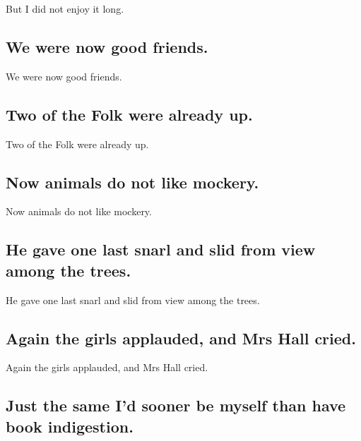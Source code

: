 \documentclass[]{article}
\begin{document}
But I did not enjoy it long.

\hypertarget{we-were-now-good-friends.}{%
\subsection{We were now good friends.}\label{we-were-now-good-friends.}}

We were now good friends.

\hypertarget{two-of-the-folk-were-already-up.}{%
\subsection{Two of the Folk were already
up.}\label{two-of-the-folk-were-already-up.}}

Two of the Folk were already up.

\hypertarget{now-animals-do-not-like-mockery.}{%
\subsection{Now animals do not like
mockery.}\label{now-animals-do-not-like-mockery.}}

Now animals do not like mockery.

\hypertarget{he-gave-one-last-snarl-and-slid-from-view-among-the-trees.}{%
\subsection{He gave one last snarl and slid from view among the
trees.}\label{he-gave-one-last-snarl-and-slid-from-view-among-the-trees.}}

He gave one last snarl and slid from view among the trees.

\hypertarget{again-the-girls-applauded-and-mrs-hall-cried.}{%
\subsection{Again the girls applauded, and Mrs Hall
cried.}\label{again-the-girls-applauded-and-mrs-hall-cried.}}

Again the girls applauded, and Mrs Hall cried.

\hypertarget{just-the-same-id-sooner-be-myself-than-have-book-indigestion.}{%
\subsection{Just the same I'd sooner be myself than have book
indigestion.}\label{just-the-same-id-sooner-be-myself-than-have-book-indigestion.}}
\end{document}
